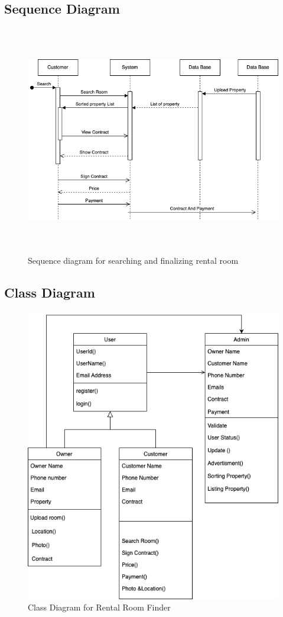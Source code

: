 \subsection{Sequence Diagram}
\begin{figure}[hbt!]
    \centering
     \includegraphics[width=150mm,height=100mm]{sequence.drawio.png}
    \caption{Sequence diagram for searching and finalizing rental room}
    \label{fig:Sequence Diagram}
\end{figure}
\newpage
\subsection{Class Diagram}
\begin{figure}[hbt!]
    \centering
     \includegraphics[width=150mm]{class.drawio.png}
    \caption{Class Diagram for Rental Room Finder }
    \label{fig:Class Diagram}
\end{figure}
\newpage
